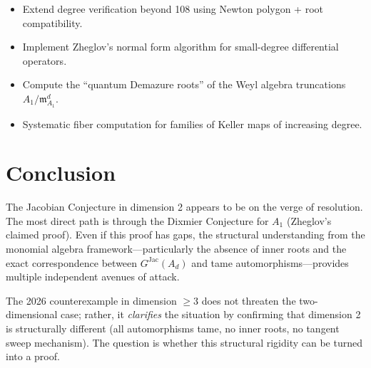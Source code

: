 \documentclass[12pt,a4paper]{article}
\theoremstyle{definition}
\newcommand{\GJac}{G^{\mathrm{Jac}}}
\begin{document}
\begin{itemize}
\item Extend degree verification beyond 108 using Newton polygon + root compatibility.
\item Implement Zheglov's normal form algorithm for small-degree differential operators.
\item Compute the ``quantum Demazure roots'' of the Weyl algebra truncations
  $A_1 / \mathfrak{m}^d_{A_1}$.
\item Systematic fiber computation for families of Keller maps of increasing degree.
\end{itemize}

\section{Conclusion}

The Jacobian Conjecture in dimension 2 appears to be on the verge of resolution.
The most direct path is through the Dixmier Conjecture for $A_1$ (Zheglov's claimed
proof). Even if this proof has gaps, the structural understanding from the monomial
algebra framework---particularly the absence of inner roots and the exact
correspondence between $\GJac(A_d)$ and tame automorphisms---provides multiple
independent avenues of attack.

The 2026 counterexample in dimension $\geq 3$ does not threaten the two-dimensional
case; rather, it \emph{clarifies} the situation by confirming that dimension 2 is
structurally different (all automorphisms tame, no inner roots, no tangent sweep
mechanism). The question is whether this structural rigidity can be turned into a proof.
\end{document}
